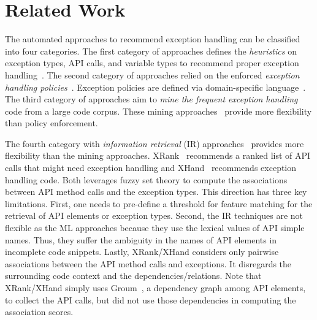 \section{Related Work}
\label{sec:related}

The automated approaches to recommend exception handling can be
classified into four categories. The first category of approaches
defines the {\em heuristics} on exception types, API calls, and
variable types to recommend proper exception
handling~\cite{barbosa-bsse12}.
The second category of approaches relied on the enforced {\em
  exception handling policies}~\cite{barbosa-tse16,barbosa-saner18}.
Exception policies are defined via domain-specific
language~\cite{barbosa-tse16}.
The third category of approaches aim to {\em mine the frequent
  exception handling} code from a large code corpus. These mining
approaches~\cite{chanchal-scam14} provide more flexibility than policy
enforcement.

The fourth category with {\em information retrieval} (IR)
approaches~\cite{xrank-fse20} provides more flexibility than the
mining approaches. XRank~\cite{xrank-fse20} recommends a ranked list
of API calls that might need exception handling and
XHand~\cite{xrank-fse20} recommends exception handling code. Both
leverages fuzzy set theory to compute the associations between API
method calls and the exception types. This direction has three key
limitations. First, one needs to pre-define a threshold for feature
matching for the retrieval of API elements or exception types. Second,
the IR techniques are not flexible as the ML approaches because they
use the lexical values of API simple names. Thus, they suffer the
ambiguity in the names of API elements in incomplete code
snippets. Lastly, XRank/XHand considers only pairwise associations
between the API method calls and exceptions. It disregards the
surrounding code context and the dependencies/relations. Note that
XRank/XHand simply uses Groum~\cite{fse09}, a dependency graph among
API elements, to collect the API calls, but did not use those
dependencies in computing the association scores.


